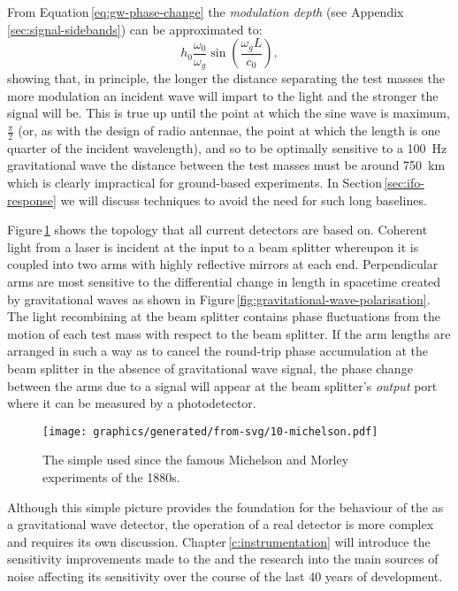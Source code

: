 From Equation\,\ref{eq:gw-phase-change} the \emph{modulation depth} (see Appendix\,\ref{sec:signal-sidebands}) can be approximated to:
\begin{equation}
  h_0 \frac{\omega_0}{\omega_g} \sin \left( \frac{\omega_g L}{c_0} \right),
\end{equation}
showing that, in principle, the longer the distance separating the test masses the more modulation an incident wave will impart to the light and the stronger the signal will be. This is true up until the point at which the sine wave is maximum, $\frac{\pi}{2}$ (or, as with the design of radio antennae, the point at which the length is one quarter of the incident wavelength), and so to be optimally sensitive to a \SI{100}{\hertz} gravitational wave the distance between the test masses must be around \SI{750}{\kilo\meter} which is clearly impractical for ground-based experiments. In Section\,\ref{sec:ifo-response} we will discuss techniques to avoid the need for such long baselines.

Figure\,\ref{fig:mi} shows the \MI{} topology that all current detectors are based on. Coherent light from a laser is incident at the input to a beam splitter whereupon it is coupled into two arms with highly reflective mirrors at each end. Perpendicular arms are most sensitive to the differential change in length in spacetime created by gravitational waves as shown in Figure\,\ref{fig:gravitational-wave-polarisation}. The light recombining at the beam splitter contains phase fluctuations from the motion of each test mass with respect to the beam splitter. If the arm lengths are arranged in such a way as to cancel the round-trip phase accumulation at the beam splitter in the absence of gravitational wave signal, the phase change between the arms due to a signal will appear at the beam splitter's \emph{output} port where it can be measured by a photodetector.

\begin{figure}
  \centering
  \texttt{[image: graphics/generated/from-svg/10-michelson.pdf]}
  \caption[Simple \MI{}]{\label{fig:mi}The simple \MI{} used since the famous Michelson and Morley experiments of the 1880s.}
\end{figure}

Although this simple picture provides the foundation for the behaviour of the \MI{} as a gravitational wave detector, the operation of a real detector is more complex and requires its own discussion. Chapter\,\ref{c:instrumentation} will introduce the sensitivity improvements made to the \MI{} and the research into the main sources of noise affecting its sensitivity over the course of the last \num{40} years of development.

